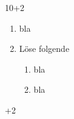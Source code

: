 \documentclass{num_exercise}
\begin{document}
  \blindtext

  \begin{question}[subtitle=Some not so easy tasks]{10+2}
  \begin{enumerate}
    \item bla
    \item Löse folgende
    \begin{enumerate}
      \item bla 
      \item bla
    \end{enumerate}
  \end{enumerate}
    \blindtext[3]
  \end{question}

  \begin{solution}[print]
    \blindtext[2]
  \end{solution}  

  \begin{question}{3}
    \blindtext[1]
  \end{question}  

  \begin{question}[subtitle=A bonus task]{+2}
    \blindtext
  \end{question}
\end{document}
